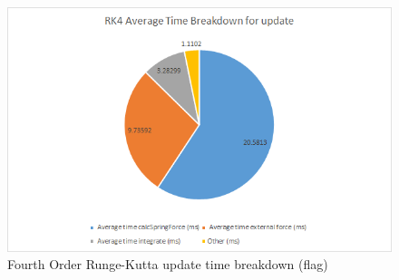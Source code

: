     \begin{figure}
    \begin{center}
      \includegraphics[scale=.9]{Figures/flag_rk4_ut}
    \end{center}
    \caption{Fourth Order Runge-Kutta update time breakdown (flag)}
    \label{fig:rk4 ut flag}
  \end{figure}


